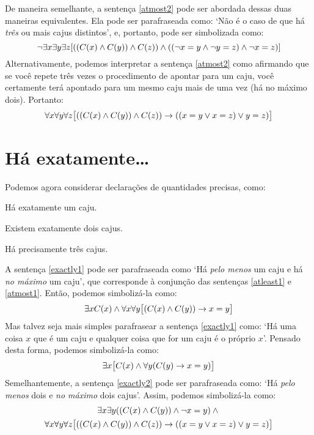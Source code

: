 De maneira semelhante, a sentença \ref{atmost2} pode ser abordada dessas duas maneiras equivalentes.
Ela pode ser parafraseada como:
`Não é o caso de que há \emph{três} ou mais cajus distintos', e, portanto, pode ser simbolizada como:
\[
	\neg\exists x \exists y\exists z[((\mathord{C}(x) \wedge \mathord{C}(y)) \wedge \mathord{C}(z)) \wedge ((\neg x = y \wedge \neg y = z) \wedge \neg x = z)]
\]
Alternativamente, podemos interpretar a sentença \ref{atmost2} como afirmando que se você repete três vezes o procedimento de apontar para um caju, você certamente terá apontado para um mesmo caju mais de uma vez (há no máximo dois).
Portanto:
$$\forall x\forall y\forall z\bigl[((\mathord{C}(x) \wedge \mathord{C}(y)) \wedge \mathord{C}(z)) \rightarrow ((x=y \vee x=z) \vee y=z)\bigr]$$


\section{Há exatamente\ldots}\label{s:HaExatamente}
Podemos agora considerar declarações de quantidades precisas, como:
\begin{earg}
\item[\ex{exactly1}] Há exatamente um caju.
\item[\ex{exactly2}] Existem exatamente dois cajus.
\item[\ex{exactly3}] Há precisamente três cajus.
\end{earg}
A sentença \ref{exactly1} pode ser parafraseada como
`Há \emph{pelo menos} um caju e há \emph{no máximo} um caju', que corresponde à conjunção das sentenças \ref{atleast1} e \ref{atmost1}. Então, podemos simbolizá-la como:
$$\exists x \mathord{C}(x) \wedge \forall x\forall y\bigl[(\mathord{C}(x) \wedge \mathord{C}(y)) \rightarrow x=y\bigr]$$
Mas talvez seja mais simples parafrasear a sentença \ref{exactly1} como:
`Há uma coisa $x$ que é um caju e qualquer coisa que for um caju é o próprio $x$'.
Pensado desta forma, podemos simbolizá-la como:
\[
	\exists x\bigl[\mathord{C}(x) \wedge \forall y(\mathord{C}(y) \rightarrow x= y)\bigr]
\]
Semelhantemente, a sentença \ref{exactly2} pode ser parafraseada como:
`Há \emph{pelo menos} dois e \emph{no máximo} dois cajus'.
Assim, podemos simbolizá-la como:
\small
\begin{multline*}
  \exists x \exists y((\mathord{C}(x) \wedge \mathord{C}(y)) \wedge \neg x = y) \wedge {}\\
  \forall x\forall y\forall z\bigl[((\mathord{C}(x) \wedge \mathord{C}(y)) \wedge \mathord{C}(z)) \rightarrow ((x=y \vee x=z) \vee y=z)\bigr]
\end{multline*}
